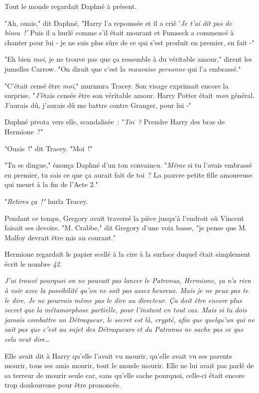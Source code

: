Tout le monde regardait Daphné à présent.

"Ah, ouais," dit Daphné, "Harry l'a repoussée et il a crié '\emph{Je t'ai dit pas de bisou~!'} Puis il a hurlé comme s'il était mourant et Fumseck a commencé à chanter pour lui - je ne suis plus sûre de ce qui s'est produit en premier, en fait -"

"Eh bien \emph{moi}, je ne trouve pas que ça ressemble à du véritable amour," dirent les jumelles Carrow. "On dirait que c'est la \emph{mauvaise personne} qui l'a embrassé."

"C'était censé être \emph{moi}," murmura Tracey. Son visage exprimait encore la surprise. "\emph{J'}étais censée être son véritable amour. Harry Potter était \emph{mon} général. J'aurais dû, j'aurais dû me battre contre Granger, pour lui -"

Daphné pivota vers elle, scandalisée~: "\emph{Toi~?} Prendre Harry des bras de Hermione~?"

"Ouais~!" dit Tracey. "Moi~!"

"Tu es dingue," énonça Daphné d'un ton convaincu. "\emph{Même} si tu l'avais embrassé en premier, tu sais ce que ça aurait fait de toi~? La pauvre petite fille amoureuse qui meurt à la fin de l'Acte 2."

"\emph{Retires ça~!"} hurla Tracey.

Pendant ce temps, Gregory avait traversé la pièce jusqu'à l'endroit où Vincent faisait ses devoirs. "M. Crabbe," dit Gregory d'une voix basse, "je pense que M. Malfoy devrait être mis au courant."


Hermione regardait le papier scellé à la cire à la surface duquel était simplement écrit le nombre \emph{42}.

\emph{J'ai trouvé pourquoi on ne pouvait pas lancer le Patronus, Hermione, ça n'a rien à voir avec la possibilité qu'on ne soit pas assez heureux. Mais je ne peux pas te le dire. Je ne pourrais même pas le dire au directeur. Ça doit être encore plus secret que la métamorphose partielle, pour l'instant en tout cas. Mais si tu dois jamais combattre un Détraqueur, le secret est là, crypté, afin que quelqu'un qui ne sait pas que c'est au sujet des Détraqueurs et du Patronus ne sache pas ce que cela veut dire…}

Elle avait dit à Harry qu'elle l'avait vu mourir, qu'elle avait vu ses parents mourir, tous ses amis mourir, tout le monde mourir. Elle ne lui avait pas parlé de sa terreur de mourir seule car, sans qu'elle sache pourquoi, celle-ci était encore trop douloureuse pour être prononcée.

